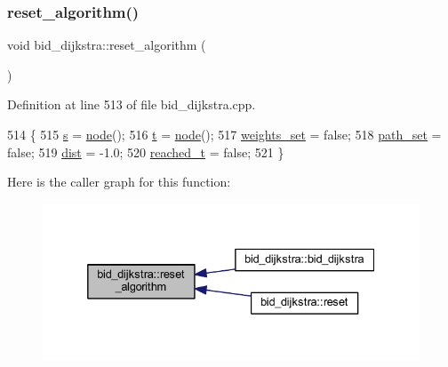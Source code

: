 \subsubsection{\texorpdfstring{reset\+\_\+algorithm()}{reset\_algorithm()}}
{\footnotesize\ttfamily void bid\+\_\+dijkstra\+::reset\+\_\+algorithm (\begin{DoxyParamCaption}{ }\end{DoxyParamCaption})\hspace{0.3cm}{\ttfamily [private]}}



Definition at line 513 of file bid\+\_\+dijkstra.\+cpp.


\begin{DoxyCode}
514 \{
515     \mbox{\hyperlink{classbid__dijkstra_a118e2ebd0d08ffc991c2bc578f8284a4}{s}} = \mbox{\hyperlink{classnode}{node}}();
516     \mbox{\hyperlink{classbid__dijkstra_a9370a71076d7807d1f3963e6dad9897e}{t}} = \mbox{\hyperlink{classnode}{node}}();
517     \mbox{\hyperlink{classbid__dijkstra_a7636f90a27d14c9eb4b115e8dad05464}{weights\_set}} = \textcolor{keyword}{false};
518     \mbox{\hyperlink{classbid__dijkstra_aa7b329f69600fffae2753f87501dab9d}{path\_set}} = \textcolor{keyword}{false};
519     \mbox{\hyperlink{classbid__dijkstra_a10224bf2b56cb3fe20cef83592ecdc13}{dist}} = -1.0;
520     \mbox{\hyperlink{classbid__dijkstra_a4714ec557ae9199e88e0242f9c6c2393}{reached\_t}} = \textcolor{keyword}{false};
521 \}
\end{DoxyCode}
Here is the caller graph for this function\+:\nopagebreak
\begin{figure}[H]
\begin{center}
\leavevmode
\includegraphics[width=332pt]{classbid__dijkstra_a16574970a28a3f453011e5b98d63e191_icgraph}
\end{center}
\end{figure}
\mbox{\label{classbid__dijkstra_a1d2f36d3977ef90285442a269a03b919}} 
